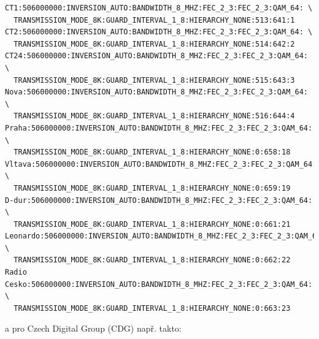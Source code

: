 \begin{small}
\begin{verbatim}
CT1:506000000:INVERSION_AUTO:BANDWIDTH_8_MHZ:FEC_2_3:FEC_2_3:QAM_64: \
  TRANSMISSION_MODE_8K:GUARD_INTERVAL_1_8:HIERARCHY_NONE:513:641:1
CT2:506000000:INVERSION_AUTO:BANDWIDTH_8_MHZ:FEC_2_3:FEC_2_3:QAM_64: \
  TRANSMISSION_MODE_8K:GUARD_INTERVAL_1_8:HIERARCHY_NONE:514:642:2
CT24:506000000:INVERSION_AUTO:BANDWIDTH_8_MHZ:FEC_2_3:FEC_2_3:QAM_64: \
  TRANSMISSION_MODE_8K:GUARD_INTERVAL_1_8:HIERARCHY_NONE:515:643:3
Nova:506000000:INVERSION_AUTO:BANDWIDTH_8_MHZ:FEC_2_3:FEC_2_3:QAM_64: \
  TRANSMISSION_MODE_8K:GUARD_INTERVAL_1_8:HIERARCHY_NONE:516:644:4
Praha:506000000:INVERSION_AUTO:BANDWIDTH_8_MHZ:FEC_2_3:FEC_2_3:QAM_64: \
  TRANSMISSION_MODE_8K:GUARD_INTERVAL_1_8:HIERARCHY_NONE:0:658:18
Vltava:506000000:INVERSION_AUTO:BANDWIDTH_8_MHZ:FEC_2_3:FEC_2_3:QAM_64: \
  TRANSMISSION_MODE_8K:GUARD_INTERVAL_1_8:HIERARCHY_NONE:0:659:19
D-dur:506000000:INVERSION_AUTO:BANDWIDTH_8_MHZ:FEC_2_3:FEC_2_3:QAM_64: \
  TRANSMISSION_MODE_8K:GUARD_INTERVAL_1_8:HIERARCHY_NONE:0:661:21
Leonardo:506000000:INVERSION_AUTO:BANDWIDTH_8_MHZ:FEC_2_3:FEC_2_3:QAM_64: \
  TRANSMISSION_MODE_8K:GUARD_INTERVAL_1_8:HIERARCHY_NONE:0:662:22
Radio Cesko:506000000:INVERSION_AUTO:BANDWIDTH_8_MHZ:FEC_2_3:FEC_2_3:QAM_64: \
  TRANSMISSION_MODE_8K:GUARD_INTERVAL_1_8:HIERARCHY_NONE:0:663:23
\end{verbatim}
\end{small}

a pro Czech Digital Group (CDG) např. takto:

